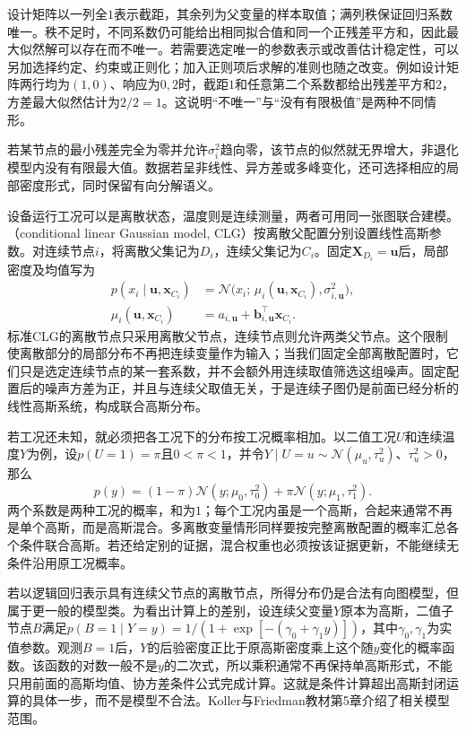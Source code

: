 设计矩阵以一列全$1$表示截距，其余列为父变量的样本取值；满列秩保证回归系数唯一。秩不足时，不同系数仍可能给出相同拟合值和同一个正残差平方和，因此最大似然解可以存在而不唯一。若需要选定唯一的参数表示或改善估计稳定性，可以另加选择约定、约束或正则化；加入正则项后求解的准则也随之改变。例如设计矩阵两行均为$(1,0)$、响应为$0,2$时，截距$1$和任意第二个系数都给出残差平方和$2$，方差最大似然估计为$2/2=1$。这说明“不唯一”与“没有有限极值”是两种不同情形。

若某节点的最小残差完全为零并允许$\sigma_i^2$趋向零，该节点的似然就无界增大，非退化模型内没有有限最大值。数据若呈非线性、异方差或多峰变化，还可选择相应的局部密度形式，同时保留有向分解语义。

设备运行工况可以是离散状态，温度则是连续测量，两者可用同一张图联合建模。（conditional linear Gaussian model, CLG）按离散父配置分别设置线性高斯参数。对连续节点$i$，将离散父集记为$D_i$，连续父集记为$C_i$。固定$\bm X_{D_i}=\bm u$后，局部密度及均值写为
\[
  \begin{aligned}
    p(x_i\mid\bm u,\bm{x}_{C_i})
      &=\mathcal N\bigl(
        x_i;\,\mu_i(\bm u,\bm x_{C_i}),\sigma_{i,\bm u}^2\bigr),\\
    \mu_i(\bm u,\bm x_{C_i})
      &=a_{i,\bm u}+\bm b_{i,\bm u}^{\top}\bm{x}_{C_i}.
  \end{aligned}
\]
标准CLG的离散节点只采用离散父节点，连续节点则允许两类父节点。这个限制使离散部分的局部分布不再把连续变量作为输入；当我们固定全部离散配置时，它们只是选定连续节点的某一套系数，并不会额外用连续取值筛选这组噪声。固定配置后的噪声方差为正，并且与连续父取值无关，于是连续子图仍是前面已经分析的线性高斯系统，构成联合高斯分布。

若工况还未知，就必须把各工况下的分布按工况概率相加。以二值工况$U$和连续温度$Y$为例，设$p(U=1)=\pi$且$0<\pi<1$，并令$Y\mid U=u\sim\mathcal N(\mu_u,\tau_u^2)$、$\tau_u^2>0$，那么
\[
  p(y)=(1-\pi)\mathcal N(y;\mu_0,\tau_0^2)
        +\pi\mathcal N(y;\mu_1,\tau_1^2).
\]
两个系数是两种工况的概率，和为$1$；每个工况内虽是一个高斯，合起来通常不再是单个高斯，而是高斯混合。多离散变量情形同样要按完整离散配置的概率汇总各个条件联合高斯。若还给定别的证据，混合权重也必须按该证据更新，不能继续无条件沿用原工况概率。

若以逻辑回归表示具有连续父节点的离散节点，所得分布仍是合法有向图模型，但属于更一般的模型类。为看出计算上的差别，设连续父变量$Y$原本为高斯，二值子节点$B$满足$p(B=1\mid Y=y)=1/(1+\exp[-(\gamma_0+\gamma_1y)])$，其中$\gamma_0,\gamma_1$为实值参数。观测$B=1$后，$Y$的后验密度正比于原高斯密度乘上这个随$y$变化的概率函数。该函数的对数一般不是$y$的二次式，所以乘积通常不再保持单高斯形式，不能只用前面的高斯均值、协方差条件公式完成计算。这就是条件计算超出高斯封闭运算的具体一步，而不是模型不合法。Koller与Friedman教材第5章介绍了相关模型范围。

